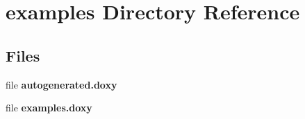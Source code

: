\section{examples Directory Reference}
\label{dir_d28a4824dc47e487b107a5db32ef43c4}
\subsection*{Files}
\begin{DoxyCompactItemize}
\item 
file {\bfseries autogenerated.\-doxy}
\item 
file {\bfseries examples.\-doxy}
\end{DoxyCompactItemize}

